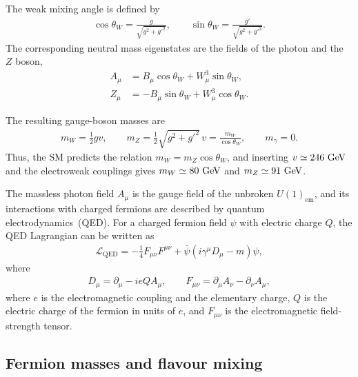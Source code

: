 The weak mixing angle is defined by
\begin{align*}
    \cos\theta_{W}
    =
    \frac{g}{\sqrt{g^{2}+g'^{2}}},
    \qquad
    \sin\theta_{W}
    =
    \frac{g'}{\sqrt{g^{2}+g'^{2}}}.
\end{align*}
The corresponding neutral mass eigenstates are the fields of the photon and the $Z$ boson,
\begin{align*}
    A_{\mu}
    &=
    B_{\mu}\cos\theta_{W}
    +
    W_{\mu}^{3}\sin\theta_{W},
    \\
    Z_{\mu}
    &=
    -
    B_{\mu}\sin\theta_{W}
    +
    W_{\mu}^{3}\cos\theta_{W}.
\end{align*} 

The resulting gauge-boson masses are
\begin{align*}
    m_{W}
    =
    \frac{1}{2}gv,
    \qquad
    m_{Z}
    =
    \frac{1}{2}\sqrt{g^{2}+g'^{2}}\,v
    =
    \frac{m_{W}}{\cos\theta_{W}},
    \qquad
    m_{\gamma}=0.
\end{align*}
Thus, the SM predicts the relation $m_{W}=m_{Z}\cos\theta_{W}$, and inserting $v \simeq 246~\mathrm{GeV}$ and the electroweak couplings gives $m_{W}\simeq80~\mathrm{GeV}$ and $m_{Z}\simeq91~\mathrm{GeV}$.

The massless photon field $A_{\mu}$ is the gauge field of the unbroken $U(1)_{\mathrm{em}}$, and its interactions with charged fermions are described by quantum electrodynamics~(QED). 
For a charged fermion field $\psi$ with electric charge $Q$, the QED Lagrangian can be written as
\begin{align*}
    \mathcal{L}_{\mathrm{QED}}
    =
    -
    \frac{1}{4}
    F_{\mu\nu}F^{\mu\nu}
    +
    \bar{\psi}
    \left(
        i\gamma^{\mu}D_{\mu}
        -
        m
    \right)
    \psi,
\end{align*}
where
\begin{align*}
    D_{\mu}
    =
    \partial_{\mu}
    -
    ieQA_{\mu},
    \qquad
    F_{\mu\nu}
    =
    \partial_{\mu}A_{\nu}
    -
    \partial_{\nu}A_{\mu},
\end{align*}
where $e$ is the electromagnetic coupling and the elementary charge, $Q$ is the electric charge of the fermion in units of $e$, and $F_{\mu\nu}$ is the electromagnetic field-strength tensor.


\subsection{Fermion masses and flavour mixing}
\label{subsec:yukawa_flavour}

